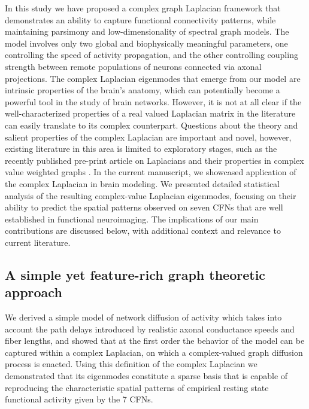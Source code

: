 In this study we have proposed a complex graph Laplacian framework that demonstrates an ability to capture functional connectivity patterns, while maintaining parsimony and low-dimensionality of spectral graph models. The model involves only two global and biophysically meaningful parameters, one controlling the speed of activity propagation, and the other controlling coupling strength between remote populations of neurons connected via axonal projections. The complex Laplacian eigenmodes that emerge from our model are intrinsic properties of the brain's anatomy, which can potentially become a powerful tool in the study of brain networks. However, it is not at all clear if the well-characterized properties of a real valued Laplacian matrix \cite{belkin_laplacian_2003} in the literature can easily translate to its complex counterpart. Questions about the theory and salient properties of the complex Laplacian are important and novel, however, existing literature in this area is limited to exploratory stages, such as the recently published pre-print article on Laplacians and their properties in complex value weighted graphs \cite{dong_complex_2015}. In the current manuscript, we showcased application of the complex Laplacian in brain modeling. We presented detailed statistical analysis of the resulting complex-value Laplacian eigenmodes, focusing on their ability to predict the spatial patterns observed on seven CFNs that are well established in functional neuroimaging. The implications of our main contributions are discussed below, with additional context and relevance to current literature.

\subsection{A simple yet feature-rich graph theoretic approach}
We derived a simple model of network diffusion of activity which takes into account the path delays introduced by realistic axonal conductance speeds and fiber lengths, and showed that at the first order the behavior of the model can be captured within a complex Laplacian, on which a complex-valued graph diffusion process is enacted. Using this definition of the complex Laplacian we demonstrated that its eigenmodes constitute a sparse basis that is capable of reproducing the characteristic spatial patterns of empirical resting state functional activity given by the 7 CFNs.

